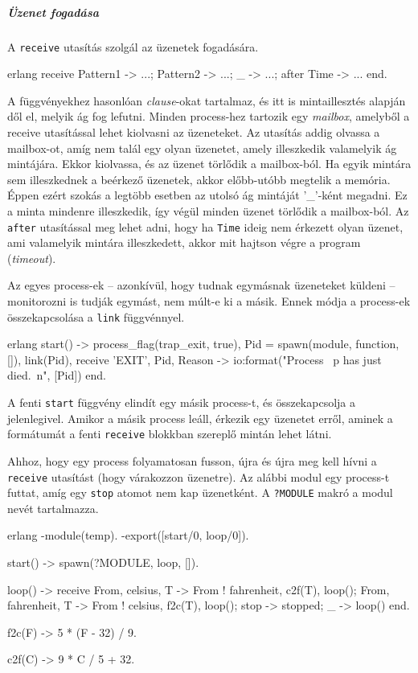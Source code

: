 \documentclass[12pt, a4paper, oneside]{book}
\begin{document}
\subparagraph{Üzenet fogadása} A \texttt{receive} utasítás szolgál az üzenetek
fogadására. 
\begin{code}{erlang}{}
receive
  Pattern1 ->
        ...;
  Pattern2 ->
        ...;
  _ ->
        ...;
after Time ->
        ...
end.
\end{code}

\noindent A függvényekhez hasonlóan \emph{clause}-okat tartalmaz, és itt is
mintaillesztés alapján dől el, melyik ág fog lefutni. Minden process-hez
tartozik egy \emph{mailbox}, amelyből a receive utasítással lehet kiolvasni az
üzeneteket. Az utasítás addig olvassa a mailbox-ot, amíg nem talál egy olyan
üzenetet, amely illeszkedik valamelyik ág mintájára. Ekkor kiolvassa, és az
üzenet törlődik a mailbox-ból. Ha egyik mintára sem illeszkednek a beérkező
üzenetek, akkor előbb-utóbb megtelik a memória. Éppen ezért szokás a legtöbb
esetben az utolsó ág mintáját '\_'-ként megadni. Ez a minta mindenre
illeszkedik, így végül minden üzenet törlődik a mailbox-ból. Az \texttt{after}
utasítással meg lehet adni, hogy ha \texttt{Time} ideig nem érkezett olyan
üzenet, ami valamelyik mintára illeszkedett, akkor mit hajtson végre a program
(\emph{timeout}).

Az egyes process-ek -- azonkívül, hogy tudnak egymásnak üzeneteket küldeni --
monitorozni is tudják egymást, nem múlt-e ki a másik. Ennek módja a process-ek
összekapcsolása a \texttt{link} függvénnyel. 

\begin{code}{erlang}{}
start() ->
  process_flag(trap_exit, true),
  Pid = spawn(module, function, []),
  link(Pid),
  receive
    {'EXIT', Pid, Reason} ->
      io:format("Process ~p has just died.~n", [Pid])
  end.
\end{code}

A fenti \texttt{start} függvény elindít egy másik process-t, és összekapcsolja a
jelenlegivel. Amikor a másik process leáll, érkezik egy üzenetet erről, aminek a
formátumát a fenti \texttt{receive} blokkban szereplő mintán lehet látni. 

Ahhoz, hogy egy process folyamatosan fusson, újra és újra meg kell hívni a
\texttt{receive} utasítást (hogy várakozzon üzenetre). Az alábbi modul egy
process-t futtat, amíg egy \texttt{stop} atomot nem kap üzenetként. A
\texttt{?MODULE} makró a modul nevét tartalmazza.

\begin{code}{erlang}{}
-module(temp).
-export([start/0, loop/0]).

start() ->
  spawn(?MODULE, loop, []).

loop() ->
  receive
    {From, celsius, T} ->
        From ! {fahrenheit, c2f(T)},
        loop();
    {From, fahrenheit, T} ->
        From ! {celsius, f2c(T)},
        loop();
    stop ->
      stopped;
    _ ->
      loop()
  end.

f2c(F) ->
  5 * (F - 32) / 9.

c2f(C) ->
  9 * C / 5 + 32.
\end{code}
\end{document}
